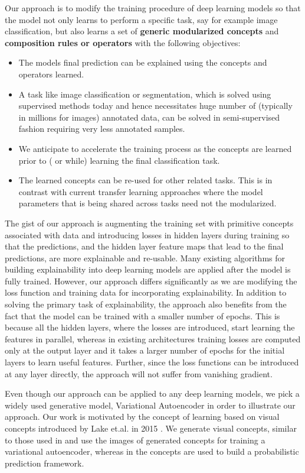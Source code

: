 \documentclass{JMLFS}
\begin{document}
Our approach is to modify the training procedure of deep learning models so that the model not only learns to perform a specific task, say for example image classification, but also learns a set of \textbf{generic modularized concepts} and \textbf{composition rules or operators} with the following objectives:
\begin{itemize}
\item The models final prediction can be explained using the concepts and operators learned.
\item A task like image classification or segmentation, which is solved using supervised methods today and hence necessitates huge number of (typically in millions for images) annotated data, can be solved in semi-supervised fashion requiring very less annotated samples.
\item We anticipate to accelerate the training process as the concepts are learned prior to ( or while) learning the final classification task.
\item The learned concepts can be re-used for other related tasks. This is in contrast with current transfer learning approaches where the model parameters that is being shared across tasks need not the modularized.
\end{itemize}

The gist of our approach is  augmenting the training set with primitive concepts associated with data and introducing losses in hidden layers during training so that the predictions, and the hidden layer feature maps that lead to the final predictions, are more explainable and re-usable.
Many existing algorithms \cite{ribeiro2016should} \cite{lundberg2017unified} \cite{zhou2016learning} for building explainability into deep learning models are applied after the model is fully trained.
However, our approach differs significantly as we are modifying the loss function and training data for incorporating explainability.
In addition to solving  the primary task of explainability, the approach also benefits from the fact that  the model can be trained with a smaller number of epochs.
This is because all the hidden layers, where the losses are introduced,  start learning the features in parallel, whereas in existing architectures training losses are computed only at the output layer and it takes a larger number of epochs for the initial layers to learn useful features.
Further, since the loss functions can be introduced at any layer directly, the approach will not suffer from vanishing gradient.

Even though our approach can be applied to any deep learning models, we pick a widely used generative model, Variational Autoencoder \cite{kingma2013auto} in order to illustrate our approach.
Our work is motivated by the concept of learning based on visual concepts  introduced by Lake et.al. in 2015 \cite{lake2015}.
We generate visual concepts, similar to those used in \cite{lake2015} and use the images of generated concepts for training a variational autoencoder, whereas in \cite{lake2015} the concepts are used to build a probabilistic prediction framework.
\end{document}

